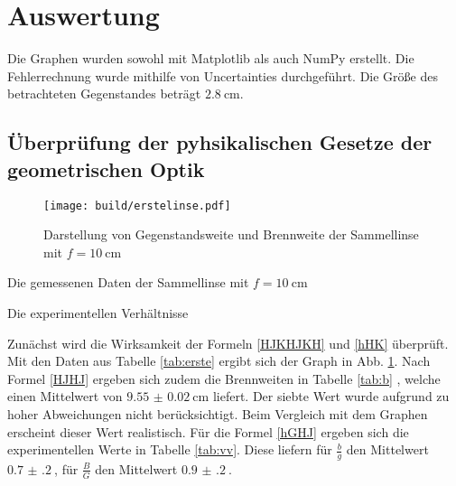 \section{Auswertung}
\label{sec:Auswertung}


Die Graphen wurden sowohl mit Matplotlib \cite{matplotlib} als auch NumPy \cite{numpy} erstellt. Die
Fehlerrechnung wurde mithilfe von Uncertainties \cite{uncertainties} durchgeführt.
 Die Größe des betrachteten Gegenstandes beträgt $\SI{2.8}{\centi\meter}$.



\subsection{Überprüfung der pyhsikalischen Gesetze der geometrischen Optik}

\begin{figure}
 \centering
 \texttt{[image: build/erstelinse.pdf]}
 \caption{Darstellung von Gegenstandsweite und Brennweite der Sammellinse mit $f = \SI{10}{\centi\meter}$}
 \label{fig:erste}
\end{figure}

\begin{table}
	\centering
	\caption{Die gemessenen Daten der Sammellinse mit $f = \SI{10}{\centi\meter}$}
	
	\label{tab:b}
\end{table}

\begin{table}
	\centering
	\caption{Die experimentellen Verhältnisse}
	
	\label{tab:vv}
\end{table}

Zunächst wird die Wirksamkeit der Formeln \eqref{HJKHJKH} und \eqref{hHK} überprüft.
Mit den Daten aus Tabelle \ref{tab:erste} ergibt sich der Graph in Abb. \ref{fig:erste}. Nach Formel \eqref{HJHJ} ergeben sich zudem die Brennweiten in Tabelle \ref{tab:b}
, welche einen Mittelwert von $\SI{9.55(2)}{\centi\meter}$ liefert. Der siebte Wert wurde aufgrund zu hoher Abweichungen nicht berücksichtigt. Beim Vergleich mit dem Graphen erscheint dieser Wert realistisch.
Für die Formel \eqref{hGHJ} ergeben sich die experimentellen Werte in Tabelle \ref{tab:vv}. Diese liefern für $\frac{b}{g}$ den Mittelwert
$\SI{0.7(2)}{}$, für $\frac{B}{G}$ den Mittelwert $\SI{0.9(2)}{}$.



